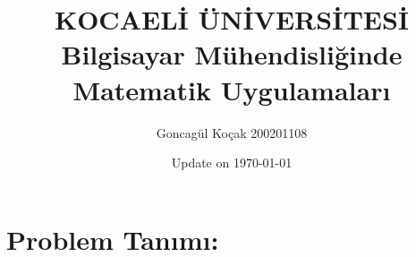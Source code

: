 
% 




\title{\bf \huge  KOCAELİ ÜNİVERSİTESİ \newline Bilgisayar Mühendisliğinde Matematik Uygulamaları  }

\author{
Goncagül Koçak 200201108}
\date{Update on \today}
\maketitle
\setcounter{tocdepth}{2}
\setcounter{minitocdepth}{1} 

\begin{multicols}{2}
    \dominitoc%
    \adjustmtc[3]%
   
\end{multicols}
\section*{Problem Tanımı:}
